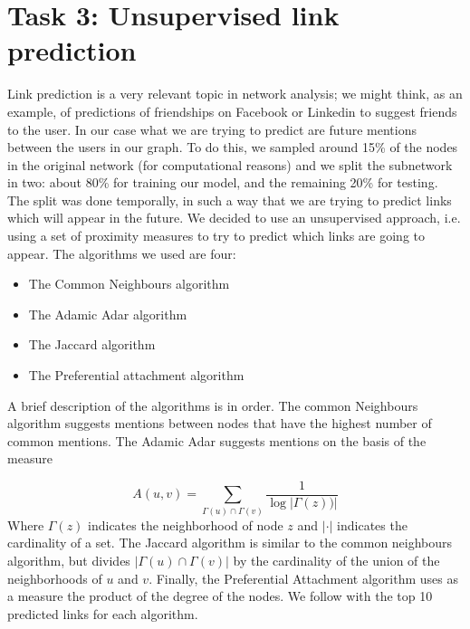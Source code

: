\documentclass[sigchi]{acmart}
\begin{document}
\section{Task 3: Unsupervised link prediction}
Link prediction is a very relevant topic in network analysis; we might think, as an example, of predictions of friendships on Facebook or Linkedin to suggest friends to the user. In our case what we are trying to predict are future mentions between the users in our graph. To do this, we sampled around 15\% of the nodes in the original network (for computational reasons) and we split the subnetwork in two: about 80\% for training our model, and the remaining 20\% for testing. The split was done temporally, in such a way that we are trying to predict links which will appear in the future. We decided to use an unsupervised approach, i.e. using a set of proximity measures to try to predict which links are going to appear. The algorithms we used are four:
\begin{itemize}
    \item The Common Neighbours algorithm
    \item The Adamic Adar algorithm
    \item The Jaccard algorithm
    \item The Preferential attachment algorithm
\end{itemize}
A brief description of the algorithms is in order. The common Neighbours algorithm suggests mentions between nodes that have the highest number of common mentions. The Adamic Adar suggests mentions on the basis of the measure

$$A(u,v) = \sum_{\Gamma(u) \cap \Gamma(v)} \frac{1}{\log|\Gamma(z))|}$$
Where $\Gamma(z)$ indicates the neighborhood of node $z$ and $|\cdot|$ indicates the cardinality of a set. The Jaccard algorithm is similar to the common neighbours algorithm, but divides $|\Gamma(u) \cap \Gamma(v)|$ by the cardinality of the union of the neighborhoods of $u$ and $v$. Finally, the Preferential Attachment algorithm uses as a measure the product of the degree of the nodes.
We follow with the top 10 predicted links for each algorithm. \\
\end{document}
